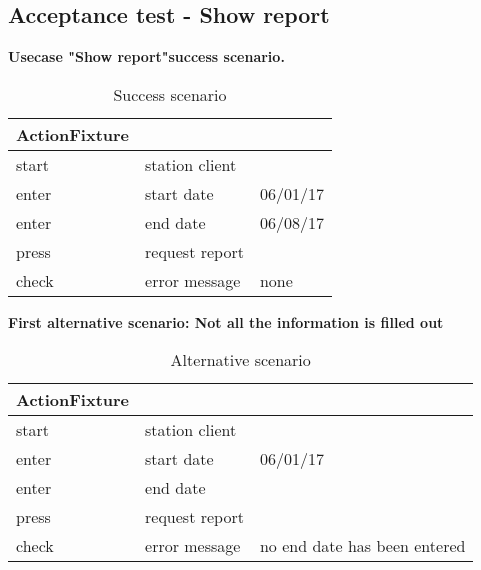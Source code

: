 \subsection{Acceptance test - Show report}

\textbf{Usecase "Show report"success scenario.}

\begin{table}[H]
    \centering
    \begin{tabular}{| l | l | l |}
        \hline
        \textbf{ActionFixture}   & & \\\hline
        start                    & station client & \\\hline
        enter                    & start date     & 06/01/17\\\hline
        enter                    & end date       & 06/08/17\\\hline
        press                    & request report & \\\hline
        check                    & error message  & none \\\hline
    \end{tabular}
    \caption{Success scenario}
\end{table}

\textbf{First alternative scenario: Not all the information is filled out}

\begin{table}[H]
    \centering
    \begin{tabular}{| l | l | l |}
        \hline
        \textbf{ActionFixture}   & & \\\hline
        start                    & station client & \\\hline
        enter                    & start date     & 06/01/17\\\hline
        enter                    & end date       & \\\hline
        press                    & request report & \\\hline
        check                    & error message  & no end date has been entered \\\hline
    \end{tabular}
    \caption{Alternative scenario}
\end{table}

